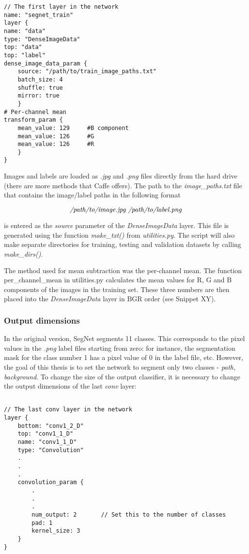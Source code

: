 \begin{lstlisting}[caption={Input layer in \textit{train.prototxt}},captionpos=b]
// The first layer in the network
name: "segnet_train"
layer {
name: "data"
type: "DenseImageData"
top: "data"
top: "label"
dense_image_data_param {
	source: "/path/to/train_image_paths.txt"
	batch_size: 4   			    			
	shuffle: true
	mirror: true	
	}
# Per-channel mean
transform_param {
	mean_value: 129		#B component
	mean_value: 126		#G
	mean_value: 126		#R
	}
}
\end{lstlisting} 

Images and labels are loaded as \textit{.jpg} and \textit{.png} files directly from the hard drive (there are more methods that Caffe offers). The path to the \textit{image\_paths.txt} file that contains the image/label paths in the following format

$$
\text{\textit{/path/to/image.jpg /path/to/label.png}}
$$

\noindent is entered as the \textit{source} parameter of the \textit{DenseImageData} layer. This file is generated using the function \textit{make\_txt()} from \textit{utilities.py}. The script will also make separate directories for training, testing and validation datasets by calling \textit{make\_dirs()}.

The method used for mean subtraction was the per-channel mean. The function per\_channel\_mean in utilities.py calculates the mean values for R, G and B components of the images in the training set. These three numbers are then placed into the \textit{DenseImageData} layer in BGR order (see Snippet XY).

\subsubsection{Output dimensions}

In the original version, SegNet segments 11 classes. This corresponds to the pixel values in the \textit{.png} label files starting from zero: for instance, the segmentation mask for the class number 1 has a pixel value of 0 in the label file, etc. However, the goal of this thesis is to set the network to segment only two classes - \textit{path, background}. To change the size of the output classifier, it is necessary to change the output dimensions of the last \textit{conv} layer:

\begin{lstlisting}[caption={Setting number of outputs in \textit{train.prototxt}},captionpos=b]

// The last conv layer in the network
layer {
	bottom: "conv1_2_D"
	top: "conv1_1_D"
	name: "conv1_1_D"
	type: "Convolution"
	.
	.
	.
	convolution_param {
		.
		.
		.
		num_output: 2		// Set this to the number of classes
		pad: 1
		kernel_size: 3
	}
}
\end{lstlisting}

